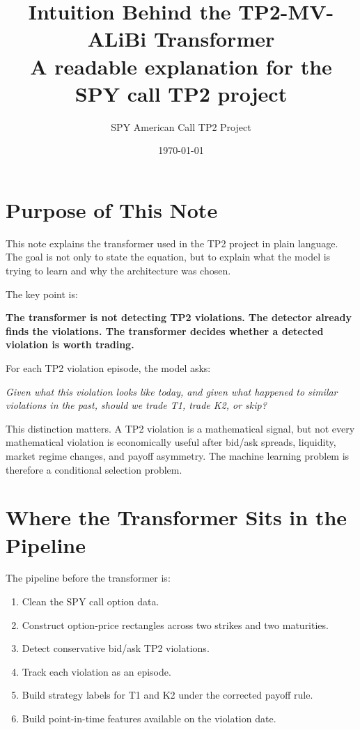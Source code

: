 \documentclass[11pt]{article}
\title{\textbf{Intuition Behind the TP2-MV-ALiBi Transformer}\\
\large A readable explanation for the SPY call TP2 project}
\author{SPY American Call TP2 Project}
\date{\today}
\newcommand{\1}{\mathbf{1}}
\begin{document}
\maketitle

\section{Purpose of This Note}

This note explains the transformer used in the TP2 project in plain language.
The goal is not only to state the equation, but to explain what the model is
trying to learn and why the architecture was chosen.

The key point is:

\begin{center}
\textbf{The transformer is not detecting TP2 violations. The detector already
finds the violations. The transformer decides whether a detected violation is
worth trading.}
\end{center}

For each TP2 violation episode, the model asks:

\begin{center}
\textit{Given what this violation looks like today, and given what happened
to similar violations in the past, should we trade T1, trade K2, or skip?}
\end{center}

This distinction matters. A TP2 violation is a mathematical signal, but not
every mathematical violation is economically useful after bid/ask spreads,
liquidity, market regime changes, and payoff asymmetry. The machine learning
problem is therefore a conditional selection problem.

\section{Where the Transformer Sits in the Pipeline}

The pipeline before the transformer is:

\begin{enumerate}[leftmargin=*]
  \item Clean the SPY call option data.
  \item Construct option-price rectangles across two strikes and two maturities.
  \item Detect conservative bid/ask TP2 violations.
  \item Track each violation as an episode.
  \item Build strategy labels for T1 and K2 under the corrected payoff rule.
  \item Build point-in-time features available on the violation date.
\end{enumerate}
\end{document}
